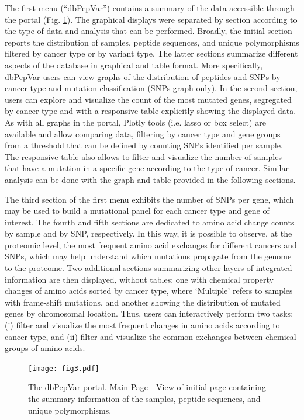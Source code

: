 \documentclass{ieeeaccess}
\begin{document}
The first menu (``dbPepVar'') contains a summary of the data accessible through the portal (Fig. \ref{fig3}). The graphical displays were separated by section according to the type of data and analysis that can be performed. Broadly, the initial section reports the distribution of samples, peptide sequences, and unique polymorphisms filtered by cancer type or by variant type. The latter sections summarize different aspects of the database in graphical and table format. More specifically, dbPepVar users can view graphs of the distribution of peptides and SNPs by cancer type and mutation classification (SNPs graph only). In the second section, users can explore and visualize the count of the most mutated genes, segregated by cancer type and with a responsive table explicitly showing the displayed data. As with all graphs in the portal, Plotly tools (i.e. lasso or box select) are available and allow comparing data, filtering by cancer type and gene groups from a threshold that can be defined by counting SNPs identified per sample. The responsive table also allows to filter and visualize the number of samples that have a mutation in a specific gene according to the type of cancer. Similar analysis can be done with the graph and table provided in the following sections.

The third section of the first menu exhibits the number of SNPs per gene, which may be used to build a mutational panel for each cancer type and gene of interest. The fourth and fifth sections are dedicated to amino acid change counts by sample and by SNP, respectively. In this way, it is possible to observe, at the proteomic level, the most frequent amino acid exchanges for different cancers and SNPs, which may help understand which mutations propagate from the genome to the proteome. Two additional sections summarizing other layers of integrated information are then displayed, without tables: one with chemical property changes of amino acids sorted by cancer type, where `Multiple' refers to samples with frame-shift mutations, and another showing the distribution of mutated genes by chromosomal location. Thus, users can interactively perform two tasks: (i) filter and visualize the most frequent changes in amino acids according to cancer type, and (ii) filter and visualize the common exchanges between chemical groups of amino acids. 



\begin{figure}[htpb]%
\centering
\texttt{[image: fig3.pdf]}
\caption{ 
The dbPepVar portal. Main Page - View of initial page containing the summary information of the samples, peptide sequences, and unique polymorphisms.  \label{fig3}}
\end{figure}
\end{document}
